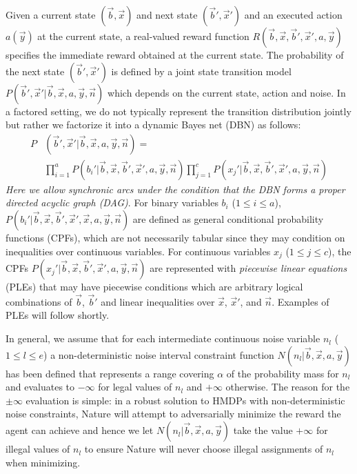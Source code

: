 \documentclass[letterpaper]{article}
\begin{document}
Given a current state $(\vec{b},\vec{x})$ and next state
$(\vec{b}',\vec{x}')$ and an executed action $a(\vec{y})$ 
at the current state, a real-valued reward function $R(\vec{b},\vec{x},\vec{b}',\vec{x}',a,\vec{y})$
specifies the immediate reward obtained at the current state. The probability of the
next state $(\vec{b}',\vec{x}')$ is defined by a joint state
transition model
$P(\vec{b}',\vec{x}'| \vec{b},\vec{x},a,\vec{y},\vec{n})$ which
depends on the current state, action and noise.
In a factored setting, we do not typically represent the transition
distribution jointly but rather we factorize it into a
dynamic Bayes net (DBN) as follows: %
{\footnotesize
\begin{align}
P&(\vec{b}',\vec{x}'|\vec{b},\vec{x}, a,\vec{y},\vec{n}) = \nonumber  \\
& \prod_{i=1}^a P(b_i'|\vec{b},\vec{x},\vec{b}',\vec{x}',a,\vec{y},\vec{n}) 
  \prod_{j=1}^c P(x_j'|\vec{b},\vec{x},\vec{b}',\vec{x}',a,\vec{y},\vec{n})
\end{align}
}
\emph{Here we allow synchronic arcs under the condition that the DBN forms
a proper directed acyclic graph (DAG)}.
For binary variables $b_i$ ($1 \leq i \leq a$),
$P(b_i'|\vec{b},\vec{x},\vec{b}',\vec{x}',\vec{x},a,\vec{y},\vec{n})$ are defined as
general conditional probability functions (CPFs), which are not necessarily tabular
since they may condition on inequalities over continuous variables.  For
continuous variables $x_j$ ($1 \leq j \leq c$), the CPFs
$P(x_j'|\vec{b},\vec{x},\vec{b}',\vec{x}',a,\vec{y},\vec{n})$ are represented
with \emph{piecewise linear equations} (PLEs) that may have piecewise 
conditions which are arbitrary logical combinations of
$\vec{b}$, $\vec{b}'$ and linear inequalities over $\vec{x}$, $\vec{x}'$,
and $\vec{n}$.  Examples of PLEs will follow shortly.

In general, we assume that for each intermediate continuous noise variable 
$n_l$ ($1 \leq l \leq e$)
a non-deterministic noise interval constraint function $N(n_l| \vec{b},\vec{x},a,\vec{y})$ 
has been defined 
that represents a range covering $\alpha$ of the probability mass for $n_l$ and evaluates to 
$-\infty$ for legal values of $n_l$ and $+\infty$ otherwise.  The reason for
the $\pm \infty$ evaluation is simple: 
in a robust solution to HMDPs with non-deterministic noise constraints, Nature will
attempt to adversarially minimize the reward the agent can achieve and hence we let
$N(n_l| \vec{b},\vec{x},a,\vec{y})$ take the value $+\infty$ for illegal values
of $n_l$ to ensure Nature will never choose illegal assignments of $n_l$ when minimizing.
\end{document}
